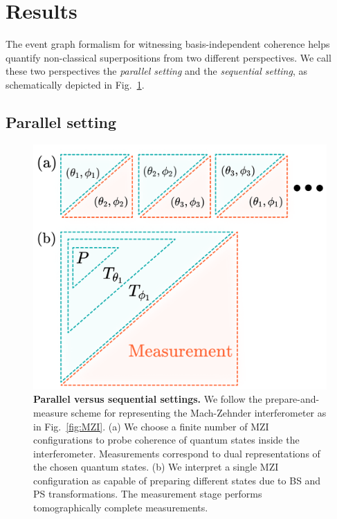 \documentclass[letterpaper,onecolumn,12pt,accepted=2024-01-17]{article}
\begin{document}
\section{Results}

The event graph formalism for witnessing basis-independent coherence helps quantify non-classical superpositions from two different perspectives. We call these two perspectives the \textit{parallel setting} and the \textit{sequential setting}, as schematically depicted in Fig.~\ref{fig: parallel vs sequential}. 


\subsection{Parallel setting}\label{subsec: parallel setting}
\begin{figure}[tb]
    \centering
    \includegraphics[width=\columnwidth]{Acc_Figures/parallelvssequential.png}
    \caption{\textbf{Parallel versus sequential settings.} We follow the prepare-and-measure scheme for representing the Mach-Zehnder interferometer as in Fig.~\ref{fig:MZI}. (a) We choose a finite number of MZI configurations to probe coherence of quantum states inside the interferometer. Measurements correspond to dual representations of the chosen quantum states. (b) We interpret a single MZI configuration as capable of preparing different states due to BS and PS transformations. The measurement stage performs tomographically complete measurements.}
    \label{fig: parallel vs sequential}
\end{figure}
\end{document}
